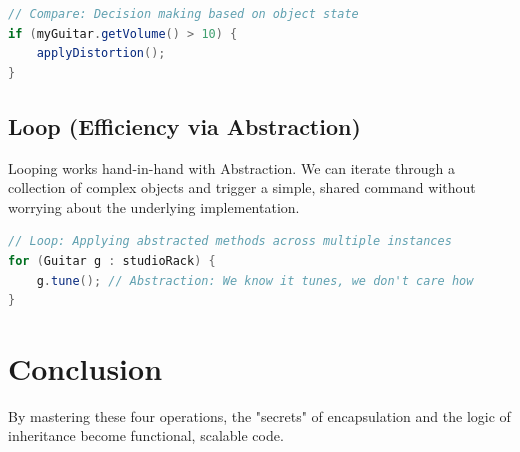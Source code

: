 \documentclass[11pt]{article}
\begin{document}
\begin{lstlisting}[language=Java]
// Compare: Decision making based on object state
if (myGuitar.getVolume() > 10) {
    applyDistortion();
}
\end{lstlisting}

\subsection{Loop (Efficiency via Abstraction)}
Looping works hand-in-hand with Abstraction. We can iterate through a collection of complex objects and trigger a simple, shared command without worrying about the underlying implementation.

\begin{lstlisting}[language=Java]
// Loop: Applying abstracted methods across multiple instances
for (Guitar g : studioRack) {
    g.tune(); // Abstraction: We know it tunes, we don't care how
}
\end{lstlisting}

\section{Conclusion}
By mastering these four operations, the "secrets" of encapsulation and the logic of inheritance become functional, scalable code.
\end{document}
